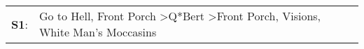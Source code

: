 \begin{supertabular}{p{0.03\textwidth}p{0.92\textwidth}}
 \textbf{S1}:  &  Go to Hell\textsuperscript{}, \enspace Front Porch\textsuperscript{} \textgreater \enspace Q*Bert\textsuperscript{} \textgreater \enspace Front Porch\textsuperscript{}, \enspace Visions\textsuperscript{}, \enspace White Man's Moccasins\textsuperscript{}  \enspace  \\
\end{supertabular}
